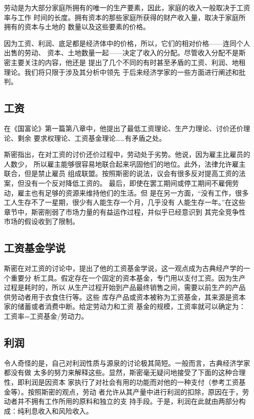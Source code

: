 劳动是为大部分家庭所拥有的唯一的生产要素，因此，家庭的收入一般取决于工资率与工作
时间的长度。拥有资本的那些家庭所获得的财产收入量，取决于家庭所拥有的资本与土地的
数量以及这些要素的价格。

因为工资、利润、底足都是经济体中的价格，所以，它们的相对价格——连同个人出售的劳动、
资本、土地数量一起——决定了收入的分配。尽管收入分配不是斯密主要关注的内容，他还是
提出了几个不同的有时甚至矛盾的工资、利润、地租理论。我们将只限于涉及其分析中领先
于后来经济学家的一些方面进行阐述和批判。

\subsection{工资}

在《国富论》第一篇第八章中，他提出了最低工资理论、生产力理论、讨价还价理论、剩余
要求权理论、工资基金理论……有矛盾之处。

斯密指出，在对工资的讨价还价过程中，劳动处于劣势。他说，因为雇主比雇员的人数少，
所以雇主能够很容易地联合起来巩固他们的地位。此外，法律允许雇主联合，但是禁止雇员
组成联盟。按照斯密的说法，议会有很多反对提高工资的法案，但没有一个反对降低工资的。
最后，即使在罢工期间或停工期间不雇佣劳动，雇主也有足够的资源来维持他们的生活。但
是在另一方面，“没有工作，很多工人生存不了一星期，很少有人能生存一个月，几乎没有
人能生存一年。”在这些章节中，斯密削弱了市场力量的有益运作过程，并似乎已经意识到
其完全竞争性市场的假设收到了限制。

\subsection{工资基金学说}

斯密在对工资的讨论中，提出了他的工资基金学说，这一观点成为古典经产学的一个重要分
析工具。假定存在一个固定的资本基金，专门用以支付工资。因为生产过程是耗时的，所以
从生产过程开始到产品最终销售之间，需要以前生产的产品供劳动者用于衣食住行等。这些
库存产品或资本被称为工资基金，其来源是资本家的储蓄或者消费中断。给定劳动力和工资
基金的规模，工资率就可以确定为：工资率=工资基金/劳动力。

\subsection{利润}

令人奇怪的是，自己对利润性质与源泉的讨论极其简短。一般而言，古典经济学家都没有做
太多的努力来解释这些。显然，斯密毫无疑问地接受了下面的这种合理性，即利润是因资本
家执行了对社会有用的功能而对他的一种支付（参考工资基金等）。按照斯密的观点，劳动
者允许从其产量中进行利润的扣除，原因在于，劳动者并不拥有工作所用的原料和独立的支
持手段。于是，利润在此就由两部分构成：纯利息收入和风险收入。

